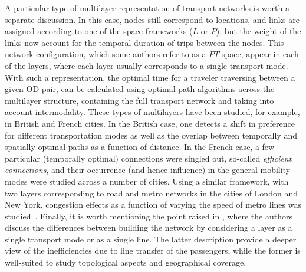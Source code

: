 A particular type of multilayer representation of transport networks is worth a separate discussion. In this case, nodes still correspond to locations, and links are assigned according to one of the  space-frameworks ($L$ or $P$), but the weight of the links now account for the temporal duration of trips between the nodes. This network configuration, which some authors refer to as a $PT$-space, appear in each of the layers, where each layer usually corresponds to a single transport mode. With such a representation, the optimal  time for a traveler traversing between a given OD pair, can be calculated using optimal path algorithms across the multilayer structure, containing the full transport network and taking into account intermodality. These types of multilayers have been studied, for example, in British \cite{gallotti_2014_anatomy} and French \cite{alessandretti_2016_user} cities. In the British case, one detects a shift in preference for different transportation modes as well as the overlap between temporally and spatially optimal paths as a function of distance. In the French case, a few particular (temporally optimal) connections were singled out, so-called \emph{efficient connections}, and their occurrence (and hence influence) in the general mobility modes were studied across a number of cities. Using a similar framework, with two layers corresponding to road and metro networks in the cities of London and New York, congestion effects as a function of varying the speed of metro lines was studied~\cite{strano_2015_multiplex}. Finally, it is worth mentioning the point raised in \cite{aleta_2016_multilayer}, where the authors discuss the differences between building the network by considering a layer as a single transport mode or as a single line. The latter description provide a deeper view of the inefficiencies due to line transfer of the passengers, while the former is well-suited to study topological aspects and geographical coverage.       














